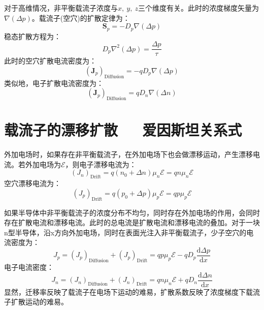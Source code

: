 对于高维情况，非平衡载流子浓度与$x,\ y,\ z$三个维度有关。此时的浓度梯度矢量为$\nabla(\Delta p)$。载流子(空穴)的扩散定律为：
\begin{equation}
    \bm S_p=-D_p\nabla(\Delta p)
\end{equation}
稳态扩散方程为：
\begin{equation}
    D_p\nabla^2(\Delta p)=\frac{\Delta p}{\tau}
\end{equation}
此时的空穴扩散电流密度为：
\begin{equation}
    (\bm J_p)_\text{Diffusion}=-qD_p\nabla(\Delta p)
\end{equation}
类似地，电子扩散电流密度为：
\begin{equation}
    (\bm J_p)_\text{Diffusion}=qD_n\nabla(\Delta n)
\end{equation}

\section{载流子的漂移扩散\ \ \ 爱因斯坦关系式}

外加电场时，如果存在非平衡载流子，在外加电场下也会做漂移运动，产生漂移电流。若外加电场为$\mathscr{E}$，则电子漂移电流为：
\begin{equation}
    (J_n)_\text{Drift}=q(n_0+\Delta n)\mu_n\mathscr{E}=qn\mu_n\mathscr{E}
\end{equation}
空穴漂移电流为：
\begin{equation}
    (J_p)_\text{Drift}=q(p_0+\Delta p)\mu_p\mathscr{E}=qp\mu_p\mathscr{E}
\end{equation}

如果半导体中非平衡载流子的浓度分布不均匀，同时存在外加电场的作用，会同时存在扩散电流和漂移电流。此时的总电流是扩散电流和漂移电流的叠加。对于一块n型半导体，沿x方向外加电场，同时在表面光注入非平衡载流子，少子空穴的电流密度为：
\begin{equation}
    J_p=(J_p)_\text{Diffusion}+(J_p)_\text{Drift}=qp\mu_p\mathscr{E}-qD_p\frac{\mathrm{d}\Delta p}{\mathrm{d}x}\label{eq:chap-5-unequilibrium-hole-total-J}
\end{equation}
电子电流密度：
\begin{equation}
    J_n=(J_n)_\text{Diffusion}+(J_n)_\text{Drift}=qn\mu_n\mathscr{E}+qD_n\frac{\mathrm{d}\Delta n}{\mathrm{d}x}\label{eq:chap-5-unequilibrium-electron-total-J}
\end{equation}
显然，迁移率反映了载流子在电场下运动的难易，扩散系数反映了浓度梯度下载流子扩散运动的难易。


